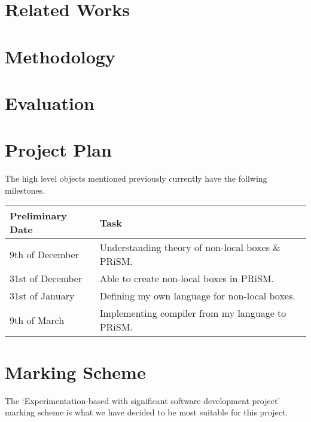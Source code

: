 \documentclass[12pt, a4paper]{article}
\begin{document}

\section{Related Works} %
\label{sec:related_works}


\section{Methodology} %
\label{sec:methodology}


\section{Evaluation} %
\label{sec:evaluation}


\section{Project Plan} %
\label{sec:project_plan}
The high level objects mentioned previously currently have the follwing
milestones.

\begin{center}
    \begin{tabular}{l | p{7.5cm}}
        Preliminary Date & Task \\
        \hline
        9th of December & Understanding theory of non-local boxes \& PRiSM. \\

        31st of December & Able to create non-local boxes in PRiSM. \\

        31st of January & Defining my own language for non-local boxes. \\

        9th of March & Implementing compiler from my language to PRiSM. \\
\end{tabular}
\end{center}


\section{Marking Scheme} %
\label{sec:marking_scheme}
The `Experimentation-based with significant software development project'
marking scheme is what we have decided to be most suitable for this project.
\end{document}
